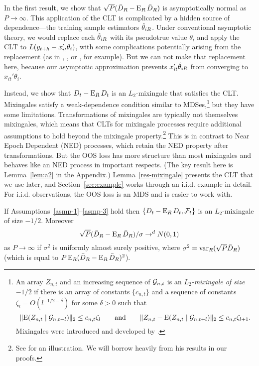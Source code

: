 In the first result, we show that
$\sqrt{P} (\bar{D}_{R} - \operatorname{E}_R \bar{D}_{R})$ is asymptotically normal as $P \to
\infty$. This application of the CLT is complicated by a hidden source
of dependence---the training sample estimators $\hat\theta_{iR}$. Under
conventional asymptotic theory, we would replace each $\hat\theta_{iR}$ with
its pseudotrue value $\theta_i$ and apply the CLT to
$L(y_{t+h} - x_{it}'\theta_i)$, with some complications potentially
arising from the replacement (as in \citealp{Wes:96},
\citealp{ClM:01}, or \citealp{Mcc:07}, for example). But we can not
make that replacement here, because our asymptotic approximation
prevents $x_{it}'\hat\theta_{iR}$ from converging to $x_{it}'\theta_i$.

Instead, we show that $D_t - \operatorname{E}_R D_t$ is an $L_2$-mixingale that
satisfies the CLT. Mixingales satisfy a weak-dependence condition
similar to MDSes,\footnote{%
  An array $Z_{n,t}$ and an increasing sequence of \sfields
  $\mathcal{G}_{n,t}$ is an \emph{$L_2$-mixingale of size $-1/2$} if there is
  an array of constants $\{c_{n,t}\}$ and a sequence of constants
  $\zeta_l = O(l^{-1/2 - \delta})$ for some $\delta > 0$ such that
  \begin{equation*}
    \lVert \operatorname{E}(Z_{n,t} \mid \mathcal{G}_{n,t-l}) \rVert_2
    \leq c_{n,t} \zeta_l
    \qquad\text{and}\qquad
    \lVert Z_{n,t} - \operatorname{E}(Z_{n,t} \mid \mathcal{G}_{n,t+l}) \rVert_2
    \leq c_{n,t} \zeta_{l+1}.
  \end{equation*}
  Mixingales were introduced and developed by
  \citet{Mcl:74,Mcl:75,Mcl:75b,Mcl:77}.} %
but they have some limitations. Transformations of mixingales are
typically not themselves mixingales, which means that CLTs for
mixingale processes require additional assumptions to hold beyond the
mixingale property.\footnote{%
  See \citet{Jon:97} for an illustration. We will borrow heavily from
  his results in our proofs.} %
This is in contrast to Near Epoch Dependent (NED) processes, which
retain the NED property after transformations. \citep[See chapter 17
of][for further discussion of these properties.]{Dav:94} But the OOS
loss has more structure than most mixingales and behaves like an NED
process in important respects. (The key result here is
Lemma~\ref{lem:a2} in the Appendix.) Lemma~\ref{res-mixingale} presents the
CLT that we use later, and Section~\ref{sec:example} works through an
i.i.d. example in detail. For i.i.d. observations, the OOS loss is an
MDS and is easier to work with.

\begin{lem}\label{res-mixingale}
  If Assumptions~\ref{asmp-1}--\ref{asmp-3} hold then $\{D_t - \operatorname{E}_R
  D_t, \mathcal F_t\}$ is an $L_2$-mixingale of size $-1/2$.
  Moreover
  \begin{equation}
    \sqrt{P}(\bar{D}_{R} - \operatorname{E}_R \bar{D}_{R})/\sigma \to^d N(0,1)
  \end{equation}
  as $P \to \infty$ if $\sigma^2$ is uniformly almost surely positive,
  where $\sigma^2 = \operatorname{var}_R(\sqrt{P} \bar{D}_{R})$ (which is equal to $P
  \operatorname{E}_R(\bar{D}_R - \operatorname{E}_R \bar{D}_R)^2$).
\end{lem}

